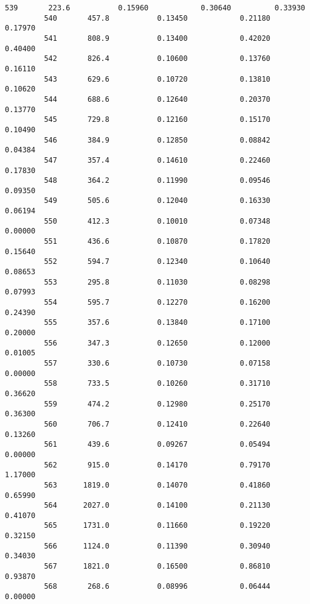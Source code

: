 \documentclass[11pt]{article}
\begin{document}
\begin{Verbatim}[commandchars=\\\{\}]
         539       223.6           0.15960            0.30640          0.33930   
         540       457.8           0.13450            0.21180          0.17970   
         541       808.9           0.13400            0.42020          0.40400   
         542       826.4           0.10600            0.13760          0.16110   
         543       629.6           0.10720            0.13810          0.10620   
         544       688.6           0.12640            0.20370          0.13770   
         545       729.8           0.12160            0.15170          0.10490   
         546       384.9           0.12850            0.08842          0.04384   
         547       357.4           0.14610            0.22460          0.17830   
         548       364.2           0.11990            0.09546          0.09350   
         549       505.6           0.12040            0.16330          0.06194   
         550       412.3           0.10010            0.07348          0.00000   
         551       436.6           0.10870            0.17820          0.15640   
         552       594.7           0.12340            0.10640          0.08653   
         553       295.8           0.11030            0.08298          0.07993   
         554       595.7           0.12270            0.16200          0.24390   
         555       357.6           0.13840            0.17100          0.20000   
         556       347.3           0.12650            0.12000          0.01005   
         557       330.6           0.10730            0.07158          0.00000   
         558       733.5           0.10260            0.31710          0.36620   
         559       474.2           0.12980            0.25170          0.36300   
         560       706.7           0.12410            0.22640          0.13260   
         561       439.6           0.09267            0.05494          0.00000   
         562       915.0           0.14170            0.79170          1.17000   
         563      1819.0           0.14070            0.41860          0.65990   
         564      2027.0           0.14100            0.21130          0.41070   
         565      1731.0           0.11660            0.19220          0.32150   
         566      1124.0           0.11390            0.30940          0.34030   
         567      1821.0           0.16500            0.86810          0.93870   
         568       268.6           0.08996            0.06444          0.00000   
         

\end{Verbatim}
\end{document}
